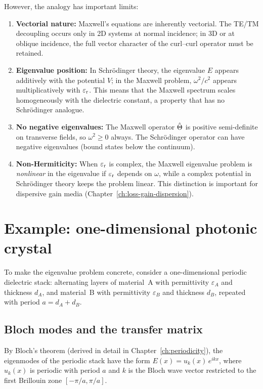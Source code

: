 However, the analogy has important limits:
\begin{enumerate}
 \item \textbf{Vectorial nature:} Maxwell's equations are inherently
 vectorial. The TE/TM decoupling occurs only in 2D systems at normal
 incidence; in 3D or at oblique incidence, the full vector character of
 the curl--curl operator must be retained.
 \item \textbf{Eigenvalue position:} In Schr\"odinger theory, the
 eigenvalue $E$ appears additively with the potential $V$; in the
 Maxwell problem, $\omega^2/c^2$ appears multiplicatively with $\varepsilon_{\mathrm{r}}$.
 This means that the Maxwell spectrum scales homogeneously with the
 dielectric constant, a property that has no Schr\"odinger analogue.
 \item \textbf{No negative eigenvalues:} The Maxwell operator $\hat{\Theta}$ is
 positive semi-definite on transverse fields, so $\omega^2 \ge 0$ always.
 The Schr\"odinger operator can have negative eigenvalues (bound states
 below the continuum).
 \item \textbf{Non-Hermiticity:} When $\varepsilon_{\mathrm{r}}$ is complex, the Maxwell
 eigenvalue problem is \emph{nonlinear} in the eigenvalue if $\varepsilon_{\mathrm{r}}$
 depends on $\omega$, while a complex potential in Schr\"odinger theory
 keeps the problem linear. This distinction is important for
 dispersive gain media (Chapter~\ref{ch:loss-gain-dispersion}).
\end{enumerate}


\section{Example: one-dimensional photonic crystal}
\label{sec:1d-example}

To make the eigenvalue problem concrete, consider a one-dimensional
periodic dielectric stack: alternating layers of material~A with
permittivity $\varepsilon_A$ and thickness $d_A$, and material~B with
permittivity $\varepsilon_B$ and thickness $d_B$, repeated with period
$a = d_A + d_B$.

\subsection{Bloch modes and the transfer matrix}
\label{ssec:1d-bloch}

By Bloch's theorem (derived in detail in Chapter~\ref{ch:periodicity}),
the eigenmodes of the periodic stack have the form
$E(x) = u_k(x)\,e^{ikx}$, where $u_k(x)$ is periodic with period $a$
and $k$ is the Bloch wave vector restricted to the first Brillouin zone
$[-\pi/a, \pi/a]$.

